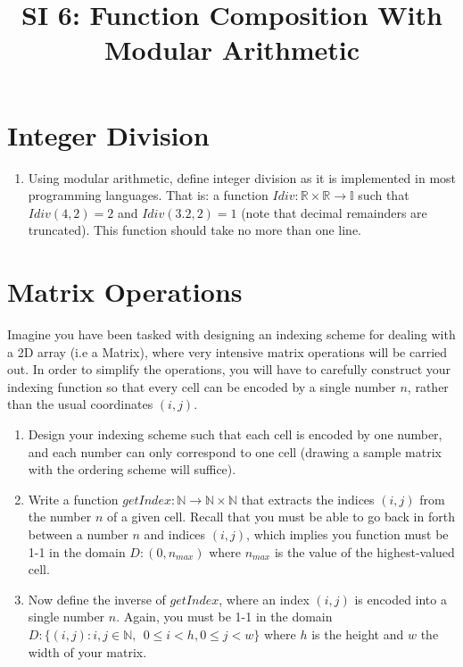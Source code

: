 \documentclass[12pt]{article}
\date{}
\author{}
\title{SI 6: Function Composition With Modular Arithmetic}
\begin{document}
	\maketitle
	\section{Integer Division}
	\begin{enumerate}
	\item Using modular arithmetic, define integer division as it is implemented in most programming languages. That is: a function $Idiv: \mathbb{R}\times \mathbb{R} \to \mathbb{I}$ such that $Idiv(4,2) = 2$ and $Idiv(3.2, 2) = 1$ (note that decimal remainders are truncated). This function should take no more than one line.
	\end{enumerate}
	
	\section{Matrix Operations}
	Imagine you have been tasked with designing an indexing scheme for dealing with a 2D array (i.e a Matrix), where very intensive matrix operations will be carried out. In order to simplify the operations, you will have to carefully construct your indexing function so that every cell can be encoded by a single number $n$, rather than the usual coordinates $(i,j)$.
	\begin{enumerate}[resume]
		\item Design your indexing scheme such that each cell is encoded by one number, and each number can only correspond to one cell (drawing a sample matrix with the ordering scheme will suffice).
		\item Write a function $getIndex: \mathbb{N} \to \mathbb{N}\times \mathbb{N}$ that extracts the indices $(i,j)$ from the number $n$ of a given cell. Recall that you must be able to go back in forth between a number $n$ and indices $(i,j)$, which implies you function must be 1-1 in the domain $D:(0,n_{max})$ where $n_{max}$ is the value of the highest-valued cell.
		\item Now define the inverse of $getIndex$, where an index $(i,j)$ is encoded into a single number $n$. Again, you must be 1-1 in the domain \\$D: \{(i,j) : i,j\in \mathbb{N}, \:\: 0\leq i < h, 0 \leq j < w\}$ where $h$ is the height and $w$ the width of your matrix.
	\end{enumerate}
	
\end{document}
